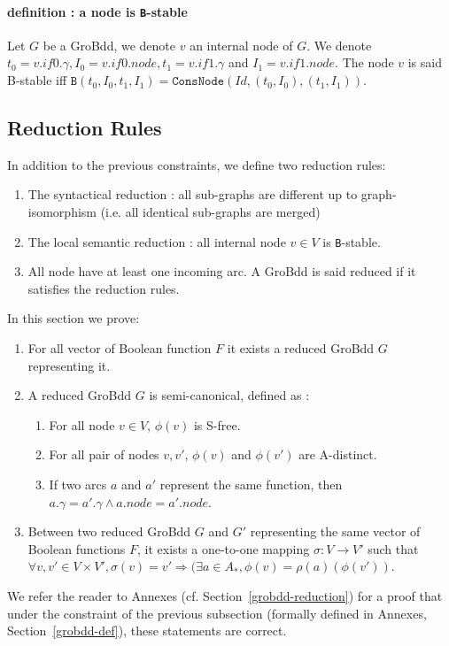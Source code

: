 \documentclass[a4paper,10pt]{article}
\begin{document}
\paragraph{definition : a node is \texttt{B}-stable\\}
Let $G$ be a GroBdd, we denote $v$ an internal node of $G$.
We denote $t_0 = v.if0.\gamma, I_0 = v.if0.node, t_1 = v.if1.\gamma$ and $I_1 = v.if1.node$.
The node $v$ is said B-stable iff $\mathtt{B}(t_0, I_0, t_1, I_1) = \mathtt{ConsNode}(Id, (t_0, I_0), (t_1, I_1))$.


\subsection{Reduction Rules}
In addition to the previous constraints, we define two reduction rules:\begin{enumerate}
\item The syntactical reduction : all sub-graphs are different up to graph-isomorphism (i.e. all identical sub-graphs are merged)
\item The local semantic reduction : all internal node $v\in V$ is \texttt{B}-stable.
\item All node have at least one incoming arc.
A GroBdd is said reduced if it satisfies the reduction rules.
\end{enumerate}
In this section we prove:\begin{enumerate}
\item For all vector of Boolean function $F$ it exists a reduced GroBdd $G$ representing it.
\item A reduced GroBdd $G$ is semi-canonical, defined as :\begin{enumerate}
\item For all node $v\in V$, $\phi(v)$ is S-free.
\item For all pair of nodes $v, v'$, $\phi(v)$ and $\phi(v')$ are A-distinct.
\item If two arcs $a$ and $a'$ represent the same function, then $a.\gamma = a'.\gamma \land a.node = a'.node$.
\end{enumerate}
\item Between two reduced GroBdd $G$ and $G'$ representing the same vector of Boolean functions $F$, it exists a one-to-one mapping $\sigma : V \longrightarrow V'$ such that $\forall v, v' \in V \times V', \sigma(v) = v' \Rightarrow (\exists a \in A_{*}, \phi(v) = \rho(a)(\phi(v'))$.
\end{enumerate}

We refer the reader to Annexes (cf. Section~\ref{grobdd-reduction}) for a proof that under the constraint of the previous subsection (formally defined in Annexes, Section~\ref{grobdd-def}), these statements are correct.
\end{document}
